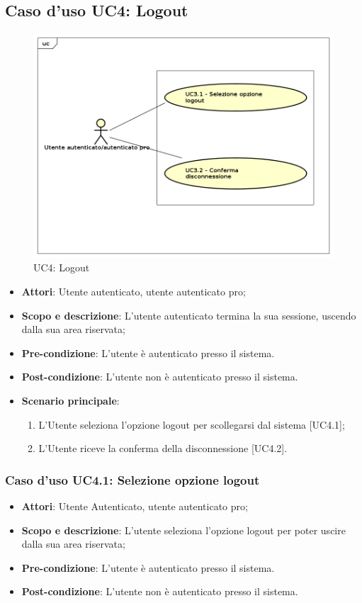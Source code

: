 \subsection{Caso d'uso UC4: Logout}
	\label{UC4}
	\begin{figure}[h]
		\centering
			\includegraphics[scale=0.45,keepaspectratio]{UML/UC4.png}
		\caption{UC4: Logout}
	\end{figure}
	\FloatBarrier
	\begin{itemize}
		\item
			\textbf{Attori}: Utente autenticato, utente autenticato pro;
		\item		
			\textbf{Scopo e descrizione}: L'utente autenticato termina la sua sessione, uscendo dalla sua area riservata;
		\item
			\textbf{Pre-condizione}: L'utente è autenticato presso il sistema.
		\item
			\textbf{Post-condizione}: L'utente non è autenticato presso il sistema. 
		\item
			\textbf{Scenario principale}:
	       		\begin{enumerate}
					\item 	
					L'Utente seleziona l'opzione logout per scollegarsi dal sistema [UC4.1];
					\item
					L'Utente riceve la conferma della disconnessione [UC4.2].
	 			\end{enumerate}
	\end{itemize}

\subsubsection{Caso d'uso UC4.1: Selezione opzione logout}
	\begin{itemize}
		\item		
			\textbf{Attori}: Utente Autenticato, utente autenticato pro;
		\item
  			\textbf{Scopo e descrizione}: L'utente seleziona l'opzione logout per poter uscire dalla sua area riservata;
		\item
			\textbf{Pre-condizione}: L'utente è autenticato presso il sistema. 
		\item
			\textbf{Post-condizione}: L'utente non è autenticato presso il sistema.
	\end{itemize}
